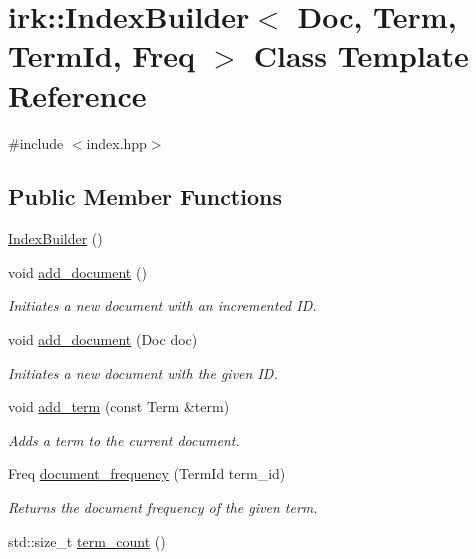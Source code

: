 \hypertarget{classirk_1_1IndexBuilder}{}\section{irk\+:\+:Index\+Builder$<$ Doc, Term, Term\+Id, Freq $>$ Class Template Reference}
\label{classirk_1_1IndexBuilder}


{\ttfamily \#include $<$index.\+hpp$>$}

\subsection*{Public Member Functions}
\begin{DoxyCompactItemize}
\item 
\mbox{\hyperlink{classirk_1_1IndexBuilder_aca3e87f67aeea3bf4b3491c867a0eac1}{Index\+Builder}} ()
\item 
void \mbox{\hyperlink{classirk_1_1IndexBuilder_a80a6db5d473f1e23b05533a142749977}{add\+\_\+document}} ()
\begin{DoxyCompactList}\small\item\em Initiates a new document with an incremented ID. \end{DoxyCompactList}\item 
void \mbox{\hyperlink{classirk_1_1IndexBuilder_a2e117cdf6c4fc918aec2120d71d61a89}{add\+\_\+document}} (Doc doc)
\begin{DoxyCompactList}\small\item\em Initiates a new document with the given ID. \end{DoxyCompactList}\item 
void \mbox{\hyperlink{classirk_1_1IndexBuilder_a93a3d32fc32223bb67350886bb5d8b88}{add\+\_\+term}} (const Term \&term)
\begin{DoxyCompactList}\small\item\em Adds a term to the current document. \end{DoxyCompactList}\item 
Freq \mbox{\hyperlink{classirk_1_1IndexBuilder_aa6802667d290644301234742a7aacced}{document\+\_\+frequency}} (Term\+Id term\+\_\+id)
\begin{DoxyCompactList}\small\item\em Returns the document frequency of the given term. \end{DoxyCompactList}\item 
std\+::size\+\_\+t \mbox{\hyperlink{classirk_1_1IndexBuilder_a3da7972f7fc0a34635ff82d6f9bc111d}{term\+\_\+count}} ()

\end{DoxyCompactItemize}
